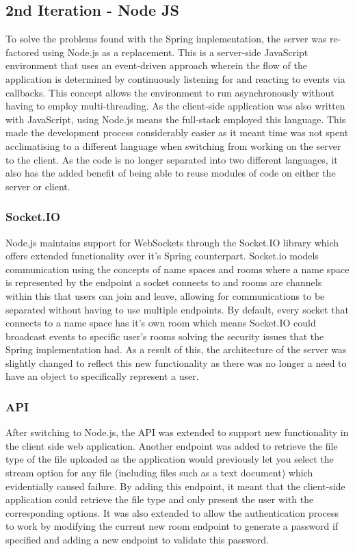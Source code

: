 \documentclass[]{report}
\begin{document}
			\subsection{2nd Iteration - Node JS}
			To solve the problems found with the Spring implementation, the server was re-factored using Node.js as a replacement. This is a server-side JavaScript environment that uses an event-driven approach wherein the flow of the application is determined by continuously listening for and reacting to events via callbacks. This concept allows the environment to run asynchronously without having to employ multi-threading. As the client-side application was also written with JavaScript, using Node.js means the full-stack employed this language. This made the development process considerably easier as it meant time was not spent acclimatising to a different language when switching from working on the server to the client. As the code is no longer separated into two different languages, it also has the added benefit of being able to reuse modules of code on either the server or client.
				\subsubsection*{Socket.IO}
				Node.js maintains support for WebSockets through the Socket.IO library which offers extended functionality over it's Spring counterpart. Socket.io models communication using the concepts of name spaces and rooms where a name space is represented by the endpoint a socket connects to and rooms are channels within this that users can join and leave, allowing for communications to be separated without having to use multiple endpoints. By default, every socket that connects to a name space has it's own room which means Socket.IO could broadcast events to specific user's rooms solving the security issues that the Spring implementation had. As a result of this, the architecture of the server was slightly changed to reflect this new functionality as there was no longer a need to have an object to specifically represent a user. 
				
				\subsubsection*{API}
				After switching to Node.js, the API was extended to support new functionality in the client side web application. Another endpoint was added to retrieve the file type of the file uploaded as the application would previously let you select the stream option for any file (including files such as a text document) which evidentially caused failure. By adding this endpoint, it meant that the client-side application could retrieve the file type and only present the user with the corresponding options. It was also extended to allow the authentication process to work by modifying the current new room endpoint to generate a password if specified and adding a new endpoint to validate this password. 
				
\end{document}
